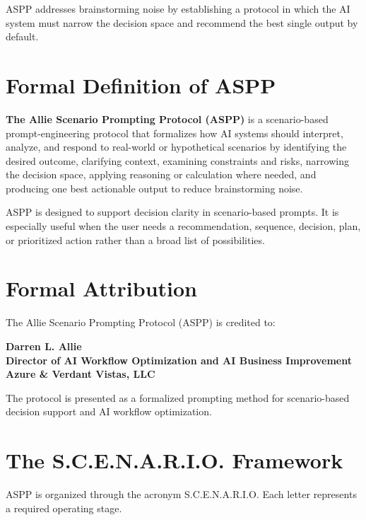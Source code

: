 \documentclass[11pt]{article}
\begin{document}
ASPP addresses brainstorming noise by establishing a protocol in which the AI system must narrow the decision space and recommend the best single output by default.

\section{Formal Definition of ASPP}

\textbf{The Allie Scenario Prompting Protocol (ASPP)} is a scenario-based prompt-engineering protocol that formalizes how AI systems should interpret, analyze, and respond to real-world or hypothetical scenarios by identifying the desired outcome, clarifying context, examining constraints and risks, narrowing the decision space, applying reasoning or calculation where needed, and producing one best actionable output to reduce brainstorming noise.

ASPP is designed to support decision clarity in scenario-based prompts. It is especially useful when the user needs a recommendation, sequence, decision, plan, or prioritized action rather than a broad list of possibilities.

\section{Formal Attribution}

The Allie Scenario Prompting Protocol (ASPP) is credited to:

\begin{center}
\textbf{Darren L. Allie}\\
\textbf{Director of AI Workflow Optimization and AI Business Improvement}\\
\textbf{Azure \& Verdant Vistas, LLC}
\end{center}

The protocol is presented as a formalized prompting method for scenario-based decision support and AI workflow optimization.

\section{The S.C.E.N.A.R.I.O. Framework}

ASPP is organized through the acronym S.C.E.N.A.R.I.O. Each letter represents a required operating stage.
\end{document}
